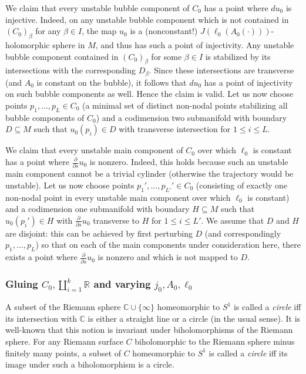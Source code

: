 \documentclass[12pt]{article}
\theoremstyle{definition}
\theoremstyle{remark}
\numberwithin{equation}{subsection}
\newcommand{\CC}{\mathbb C}
\newcommand{\RR}{\mathbb R}
\begin{document}
We claim that every unstable bubble component of $C_0$ has a point where $du_0$ is injective.  Indeed, on any unstable bubble component which is not contained in $(C_0)_\beta$ for any $\beta\in I$, the map $u_0$ is a (nonconstant!) $J(\ell_0(A_0(\cdot)))$-holomorphic sphere in $M$, and thus has such a point of injectivity.  Any unstable bubble component contained in $(C_0)_\beta$ for some $\beta\in I$ is stabilized by its intersections with the corresponding $D_\beta$.  Since these intersections are transverse (and $A_0$ is constant on the bubble), it follows that $du_0$ has a point of injectivity on such bubble components as well.  Hence the claim is valid.  Let us now choose points $p_1,\ldots,p_L\in C_0$ (a minimal set of distinct non-nodal points stabilizing all bubble components of $C_0$) and a codimension two submanifold with boundary $D\subseteq M$ such that $u_0(p_i)\in D$ with transverse intersection for $1\leq i\leq L$.

We claim that every unstable main component of $C_0$ over which $\ell_0$ is constant has a point where $\frac\partial{\partial s}u_0$ is nonzero.  Indeed, this holds because such an unstable main component cannot be a trivial cylinder (otherwise the trajectory would be unstable).  Let us now choose points $p_1',\ldots,p_{L'}'\in C_0$ (consisting of exactly one non-nodal point in every unstable main component over which $\ell_0$ is constant) and a codimension one submanifold with boundary $H\subseteq M$ such that $u_0(p_i')\in H$ with $\frac\partial{\partial s}u_0$ transverse to $H$ for $1\leq i\leq L'$.  We assume that $D$ and $H$ are disjoint: this can be achieved by first perturbing $D$ (and correspondingly $p_1,\ldots,p_L$) so that on each of the main components under consideration here, there exists a point where $\frac\partial{\partial s}u_0$ is nonzero and which is not mapped to $D$.

\subsubsection{Gluing $C_0,\coprod_{i=1}^k\RR$ and varying $j_0,A_0,\ell_0$}\label{gluingandvaryingjAl}

A subset of the Riemann sphere $\CC\cup\{\infty\}$ homeomorphic to $S^1$ is called a \emph{circle} iff its intersection with $\CC$ is either a straight line or a circle (in the usual sense).  It is well-known that this notion is invariant under biholomorphisms of the Riemann sphere.  For any Riemann surface $C$ biholomorphic to the Riemann sphere minus finitely many points, a subset of $C$ homeomorphic to $S^1$ is called a \emph{circle} iff its image under such a biholomorphism is a circle.
\end{document}
